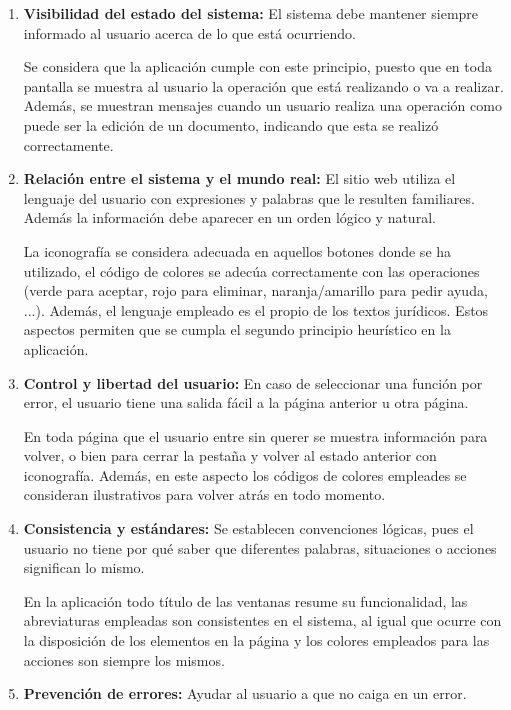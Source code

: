 \begin{enumerate}
    \item {\bf Visibilidad del estado del sistema:} El sistema debe mantener siempre informado al usuario acerca de lo que está ocurriendo.
    
    Se considera que la aplicación cumple con este principio, puesto que en toda pantalla se muestra al usuario la operación que está realizando o va a realizar. Además, se muestran mensajes cuando un usuario realiza una operación como puede ser la edición de un documento, indicando que esta se realizó correctamente.
    
    
    \item {\bf Relación entre el sistema y el mundo real:} El sitio web utiliza el lenguaje del usuario con expresiones y palabras que le resulten familiares. Además la información debe aparecer en un orden lógico y natural.
    
    La iconografía se considera adecuada en aquellos botones donde se ha utilizado, el código de colores se adecúa correctamente con las operaciones (verde para aceptar, rojo para eliminar, naranja/amarillo para pedir ayuda, ...). Además, el lenguaje empleado es el propio de los textos jurídicos. Estos aspectos permiten que se cumpla el segundo principio heurístico en la aplicación.
    
    
    \item {\bf Control y libertad del usuario:} En caso de seleccionar una función por error, el usuario tiene una salida fácil a la página anterior u otra página.
    
    En toda página que el usuario entre sin querer se muestra información para volver, o bien para cerrar la pestaña y volver al estado anterior con iconografía. Además, en este aspecto los códigos de colores empleades se consideran ilustrativos para volver atrás en todo momento.
    
    
    \item {\bf Consistencia y estándares:} Se establecen convenciones lógicas, pues el usuario no tiene por qué saber que diferentes palabras, situaciones o acciones significan lo mismo.
    
    En la aplicación todo título de las ventanas resume su funcionalidad, las abreviaturas empleadas son consistentes en el sistema, al igual que ocurre con la disposición de los elementos en la página y los colores empleados para las acciones son siempre los mismos.
    
    
    \item {\bf Prevención de errores:} Ayudar al usuario a que no caiga en un error.
    

\end{enumerate}
